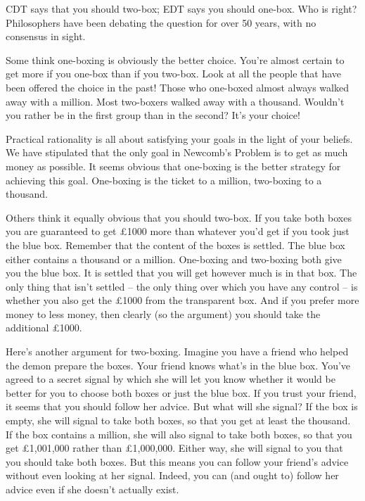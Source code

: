 CDT says that you should two-box; EDT says you should one-box. Who is right?
Philosophers have been debating the question for over 50 years, with no
consensus in sight.

Some think one-boxing is obviously the better choice. You're almost certain to
get more if you one-box than if you two-box. Look at all the people that have
been offered the choice in the past! Those who one-boxed almost always walked
away with a million. Most two-boxers walked away with a thousand. Wouldn't you
rather be in the first group than in the second? It's your choice!

Practical rationality is all about satisfying your goals in the light of your
beliefs. We have stipulated that the only goal in Newcomb's Problem is to get as
much money as possible. It seems obvious that one-boxing is the better strategy
for achieving this goal. One-boxing is the ticket to a million, two-boxing to a
thousand.

Others think it equally obvious that you should two-box. If you take both boxes
you are guaranteed to get £1000 more than whatever you'd get if you took just
the blue box. Remember that the content of the boxes is settled. The blue box
either contains a thousand or a million. One-boxing and two-boxing both give you
the blue box. It is settled that you will get however much is in that box.
The only thing that isn't settled -- the only thing over which you have any
control -- is whether you also get the £1000 from the transparent box. And if
you prefer more money to less money, then clearly (so the argument) you should
take the additional £1000.

Here's another argument for two-boxing. Imagine you have a friend who helped the
demon prepare the boxes. Your friend knows what's in the blue box. You've
agreed to a secret signal by which she will let you know whether it would be
better for you to choose both boxes or just the blue box. If you trust your
friend, it seems that you should follow her advice. But what will she signal? If
the box is empty, she will signal to take both boxes, so that you get at least
the thousand. If the box contains a million, she will also signal to take
both boxes, so that you get £1,001,000 rather than £1,000,000. Either way, she
will signal to you that you should take both boxes. But this means you can
follow your friend's advice without even looking at her signal. Indeed, you can
(and ought to) follow her advice even if she doesn't actually exist.

